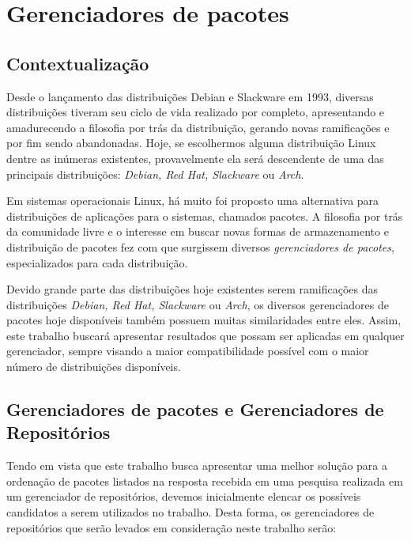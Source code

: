 \section{Gerenciadores de pacotes} %
\label{sec:distribui_es_abordadas}

\subsection{Contextualização} %
\label{sec:breve_descri_o}

Desde o lançamento das distribuições Debian e Slackware em 1993, diversas distribuições tiveram seu ciclo de vida realizado por completo, apresentando e amadurecendo a filosofia por trás da distribuição, gerando novas ramificações e por fim sendo abandonadas. Hoje, se escolhermos alguma distribuição Linux dentre as inúmeras existentes, provavelmente ela será descendente de uma das principais distribuições: \textit{Debian, Red Hat, Slackware} ou \textit{Arch}.

Em sistemas operacionais Linux, há muito foi proposto uma alternativa para distribuições de aplicações para o sistemas, chamados pacotes. A filosofia por trás da comunidade livre e o interesse em buscar novas formas de armazenamento e distribuição de pacotes fez com que surgissem diversos \textit{gerenciadores de pacotes}, especializados para cada distribuição.

Devido grande parte das distribuições hoje existentes serem ramificações das distribuições \textit{Debian, Red Hat, Slackware} ou \textit{Arch}, os diversos gerenciadores de pacotes hoje disponíveis também possuem muitas similaridades entre eles.
Assim, este trabalho buscará apresentar resultados que possam ser aplicadas em qualquer gerenciador, sempre visando a maior compatibilidade possível com o maior número de distribuições disponíveis.



\subsection{Gerenciadores de pacotes e Gerenciadores de Repositórios} %
\label{sec:gerenciadores}


Tendo em vista que este trabalho busca apresentar uma melhor solução para a ordenação de pacotes listados na resposta recebida em uma pesquisa realizada em um gerenciador de repositórios, devemos inicialmente elencar os possíveis candidatos a serem utilizados no trabalho.
Desta forma, os gerenciadores de repositórios que serão levados em consideração neste trabalho serão:


